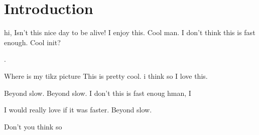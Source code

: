 \documentclass{article}
\begin{document}
\section{Introduction}

hi, Isn't this nice day to be alive! I enjoy this.
Cool man. I don't think this is fast enough.
Cool init?


.

Where is my tikz picture
This is pretty cool. i think so
I love this.

Beyond slow.
Beyond slow. I don't this is fast enoug hman, I 

I would really love if it was faster.
Beyond slow.

Don't you think so
\end{document}
